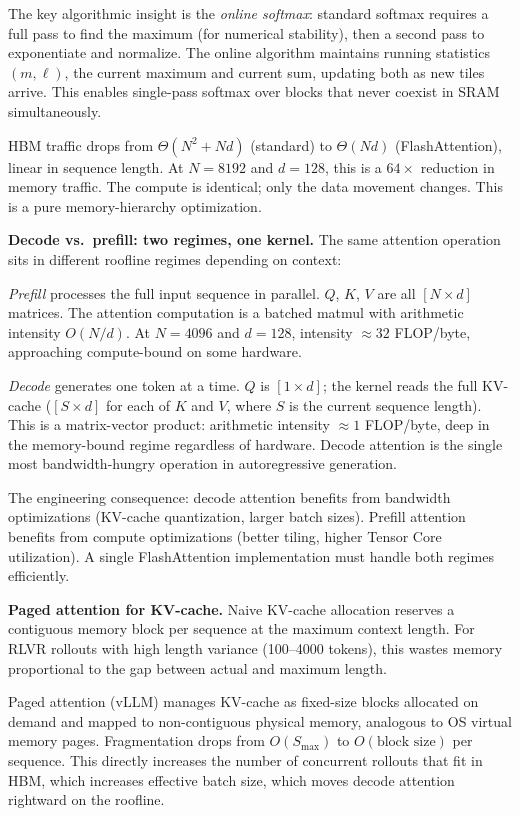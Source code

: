 The key algorithmic insight is the \textit{online softmax}: standard softmax requires a full pass to find the maximum (for numerical stability), then a second pass to exponentiate and normalize. The online algorithm maintains running statistics $(m, \ell)$, the current maximum and current sum, updating both as new tiles arrive. This enables single-pass softmax over blocks that never coexist in SRAM simultaneously.

HBM traffic drops from $\Theta(N^2 + Nd)$ (standard) to $\Theta(Nd)$ (FlashAttention), linear in sequence length. At $N = 8192$ and $d = 128$, this is a $64\times$ reduction in memory traffic. The compute is identical; only the data movement changes. This is a pure memory-hierarchy optimization.

\textbf{Decode vs.\ prefill: two regimes, one kernel.} The same attention operation sits in different roofline regimes depending on context:

\textit{Prefill} processes the full input sequence in parallel. $Q$, $K$, $V$ are all $[N \times d]$ matrices. The attention computation is a batched matmul with arithmetic intensity $O(N/d)$. At $N = 4096$ and $d = 128$, intensity $\approx 32$ FLOP/byte, approaching compute-bound on some hardware.

\textit{Decode} generates one token at a time. $Q$ is $[1 \times d]$; the kernel reads the full KV-cache ($[S \times d]$ for each of $K$ and $V$, where $S$ is the current sequence length). This is a matrix-vector product: arithmetic intensity $\approx 1$ FLOP/byte, deep in the memory-bound regime regardless of hardware. Decode attention is the single most bandwidth-hungry operation in autoregressive generation.

The engineering consequence: decode attention benefits from bandwidth optimizations (KV-cache quantization, larger batch sizes). Prefill attention benefits from compute optimizations (better tiling, higher Tensor Core utilization). A single FlashAttention implementation must handle both regimes efficiently.

\textbf{Paged attention for KV-cache.} Naive KV-cache allocation reserves a contiguous memory block per sequence at the maximum context length. For RLVR rollouts with high length variance (100--4000 tokens), this wastes memory proportional to the gap between actual and maximum length.

Paged attention (vLLM) manages KV-cache as fixed-size blocks allocated on demand and mapped to non-contiguous physical memory, analogous to OS virtual memory pages. Fragmentation drops from $O(S_{\max})$ to $O(\text{block size})$ per sequence. This directly increases the number of concurrent rollouts that fit in HBM, which increases effective batch size, which moves decode attention rightward on the roofline.

